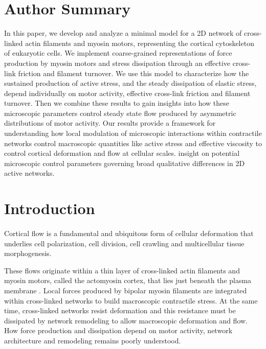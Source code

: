 \documentclass[10pt,letterpaper]{article}
\begin{document}
\section*{Author Summary}
In this paper, we develop and analyze a minimal model for a 2D network of cross-linked actin filaments and myosin motors, representing the cortical cytoskeleton of eukaryotic cells.  We implement coarse-grained representations of force production by myosin motors and stress dissipation through an effective cross-link friction and filament turnover. We use this model to characterize how the sustained production of active stress, and the steady dissipation of elastic stress, depend individually on motor activity,  effective cross-link friction and filament turnover. Then we combine these results to gain insights into how these microscopic parameters control steady state flow produced by asymmetric distributions of motor activity. Our results provide a framework for understanding how local modulation of microscopic interactions within contractile networks control macroscopic quantities like active stress and effective viscosity to control cortical deformation and flow at cellular scales. insight on potential microscopic control parameters governing broad qualitative differences in 2D active networks. 
\linenumbers

\section*{Introduction}

\paragraph{}  Cortical flow is a fundamental and ubiquitous form of cellular deformation that underlies cell polarization, cell division, cell crawling and multicellular tissue morphogenesis\cite{cellmech_flows3,cellmech_flows2,Benink:2000aa,Wilson:2010aa,Rauzi2010,Munro2004413}.  

These flows originate within a thin layer of cross-linked actin filaments and myosin motors, called the actomyosin cortex, that lies just beneath the plasma membrane \cite{Salbreux2012536}. Local forces produced by bipolar myosin filaments are integrated within cross-linked networks to build macroscopic contractile stress\cite{Murrell:2015aa,Bendix20083126,Janson1005}.  At the same time, cross-linked networks resist deformation and this resistance must be dissipated by network remodeling to allow macroscopic deformation and flow.  How force production and dissipation depend on motor activity, network architecture and remodeling remains poorly understood.
\end{document}
